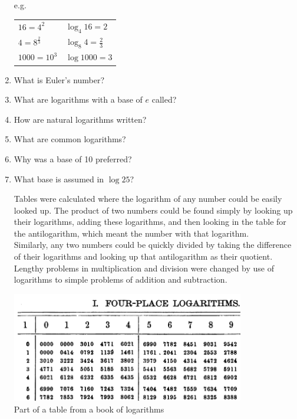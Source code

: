 \documentclass[12pt]{article}
\begin{document}
\begin{enumerate}
\begin{center}
e.g.
\begin{tabular}{ l l }
$16 = 4^2$ & $\log_4{16}=2$\\
$4 = 8^{\frac{2}{3}}$ & $\log_8{4}=\frac{2}{3}$\\
$1000 = 10^3$ & $\log{1000}=3$
\end{tabular}
\end{center}

\item What is Euler's number?
\item What are logarithms with a base of $e$ called?
\item How are natural logarithms written?
\item What are common logarithms?
\item Why was a base of 10 preferred?
\item What base is assumed in $\log25$?

Tables were calculated where the logarithm of any number could be easily looked up. The product of two numbers could be found simply by looking up their logarithms, adding these logarithms, and then looking in the table for the antilogarithm, which meant the number with that logarithm.\\

Similarly, any two numbers could be quickly divided by taking the difference of their logarithms and looking up that antilogarithm as their quotient.\\

Lengthy problems in multiplication and division were changed by use of logarithms to simple problems of addition and subtraction.\\

\begin{center}
\includegraphics[width=0.8\textwidth]{log table sample.png}\\
Part of a table from a book of logarithms\\
\end{center}


\end{enumerate}
\end{document}
